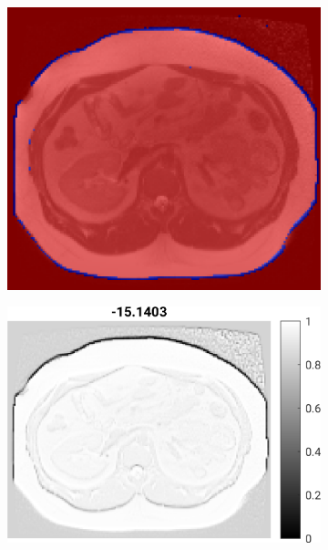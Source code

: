 \documentclass[10pt,twoside]{book}
\begin{document}
\begin{figure}
\begin{subfigure}{0.31\textwidth}
    \caption{}
    \label{fig:CNN_output_b}
  \end{subfigure}
  \begin{subfigure}{0.31\textwidth}
    \centering
    \includegraphics[width=\textwidth]{scenario4_testAutoseg_segmentationOverlay}
    \caption{}
    \label{fig:CNN_output_c}
  \end{subfigure}
  \begin{subfigure}{0.31\textwidth}
    \centering
    \includegraphics[height=0.77\textwidth]{scenario4_learnedFeatureMaps_feature1}

\end{subfigure}
\end{figure}
\end{document}
